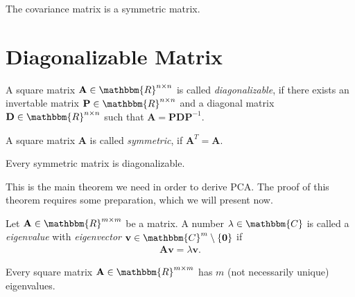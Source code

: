 The covariance matrix is a symmetric matrix.

\section{Diagonalizable Matrix}
\label{sec:diagonalizable_matrix}

\begin{definition}
	A square matrix $\mathbf{A} \in \mathbbm{R}^{n \times n}$ is called \textit{diagonalizable}, if there exists an invertable matrix $\mathbf{P} \in \mathbbm{R}^{n \times n}$ and a diagonal matrix $\mathbf{D} \in \mathbbm{R}^{n \times n}$ such that $\mathbf{A} = \mathbf{P}\mathbf{D}\mathbf{P}^{-1}$.
\end{definition}

\begin{definition}
	A square matrix $\mathbf{A}$ is called \textit{symmetric}, if $\mathbf{A}^T = \mathbf{A}$.
\end{definition}

\newpage
\begin{theorem}
	\label{th:symmetric_matrix_diagonalizable}
	Every symmetric matrix is diagonalizable.
\end{theorem}

This is the main theorem we need in order to derive PCA. The proof of this theorem requires some preparation, which we will present now.

\begin{definition}
	Let $\mathbf{A} \in \mathbbm{R}^{m\times m}$ be a matrix. A number $\lambda \in \mathbbm{C}$ is called a \textit{eigenvalue} with \textit{eigenvector} $\mathbf{v} \in \mathbbm{C}^m\setminus\{\mathbf{0}\}$ if
	\begin{align}
		\label{eq:def_eigenvalue}
		\mathbf{Av} = \lambda \mathbf{v}.
	\end{align}
\end{definition}

\begin{lemma}
	\label{lem:existence_eigenvalues}
	Every square matrix $\mathbf{A} \in \mathbbm{R}^{m\times m}$ has $m$ (not necessarily unique) eigenvalues.
\end{lemma}

